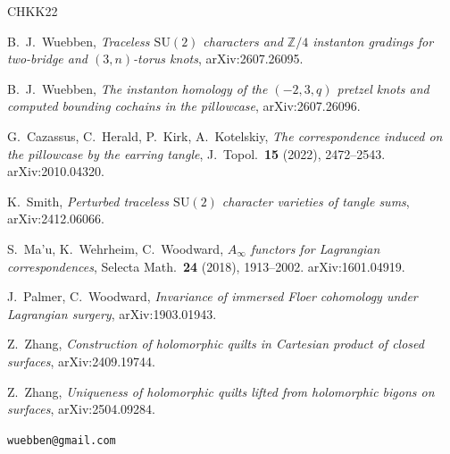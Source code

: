 \documentclass[11pt,reqno]{amsart}
\theoremstyle{plain}
\theoremstyle{definition}
\newcommand{\Z}{\mathbb{Z}}
\begin{document}
\begin{thebibliography}{CHKK22}

 B.~J.~Wuebben, \emph{Traceless $\mathrm{SU}(2)$ characters and $\Z/4$
instanton gradings for two-bridge and $(3,n)$-torus knots}, arXiv:2607.26095.

 B.~J.~Wuebben, \emph{The instanton homology of the $(-2,3,q)$ pretzel knots
and computed bounding cochains in the pillowcase}, arXiv:2607.26096.

 G.~Cazassus, C.~Herald, P.~Kirk, A.~Kotelskiy, \emph{The
correspondence induced on the pillowcase by the earring tangle}, J.\ Topol.\ \textbf{15}
(2022), 2472--2543. arXiv:2010.04320.

 K.~Smith, \emph{Perturbed traceless $\mathrm{SU}(2)$ character varieties
of tangle sums}, arXiv:2412.06066.

 S.~Ma'u, K.~Wehrheim, C.~Woodward, \emph{$A_\infty$ functors for
Lagrangian correspondences}, Selecta Math.\ \textbf{24} (2018), 1913--2002. arXiv:1601.04919.

 J.~Palmer, C.~Woodward, \emph{Invariance of immersed Floer cohomology under
Lagrangian surgery}, arXiv:1903.01943.

 Z.~Zhang, \emph{Construction of holomorphic quilts in Cartesian product of
closed surfaces}, arXiv:2409.19744.

 Z.~Zhang, \emph{Uniqueness of holomorphic quilts lifted from holomorphic
bigons on surfaces}, arXiv:2504.09284.

\end{thebibliography}

\bigskip
{} \texttt{wuebben@gmail.com}
\end{document}
